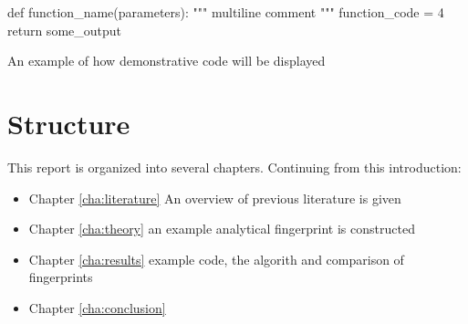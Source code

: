 \begin{listing}[hbtp!]
\begin{ExampleCode}
def function_name(parameters):
    """
    multiline comment
    """
    function_code = 4
    return some_output
\end{ExampleCode}
\caption{An example of how demonstrative code will be displayed}
\label{lst:exampleexamplecode}
\end{listing}{}

\section{Structure}
This report is organized into several chapters. Continuing from this introduction:

\begin{itemize}
    \item Chapter \ref{cha:literature} An overview of previous literature is given
    \item Chapter \ref{cha:theory} an example analytical fingerprint is constructed
    \item Chapter \ref{cha:results} example code, the algorith and comparison of fingerprints
    \item Chapter \ref{cha:conclusion}
\end{itemize}


